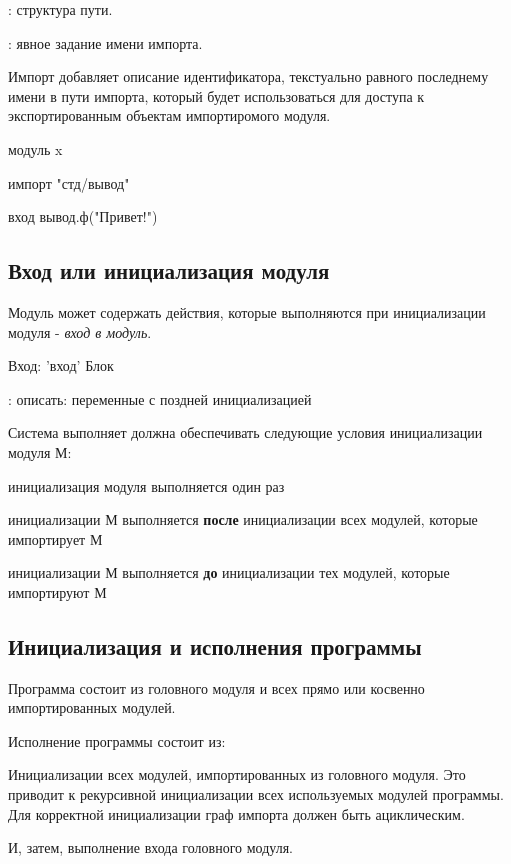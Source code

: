 \TBD: структура пути.

\TBD: явное задание имени импорта.

\bigskip
Импорт добавляет описание идентификатора, текстуально равного последнему имени в пути импорта, который будет использоваться для доступа к экспортированным объектам импортиромого модуля. 

\begin{Trivil}
модуль x

импорт "стд/вывод"

вход {
    вывод.ф("Привет!")
}
\end{Trivil}



\hypertarget{entry}{%
\subsection{Вход или инициализация модуля}\label{mods:entry}}

Модуль может содержать действия, которые выполняются при инициализации модуля - \emph{вход в модуль}. 

\begin{Trivil}
Вход: 'вход' Блок
\end{Trivil}

\TBD: описать: переменные с поздней инициализацией
\bigskip

Система выполняет должна обеспечивать следующие условия инициализации модуля М:
\begin{d_itemize}
\item
    инициализация модуля выполняется один раз
\item
    инициализации М выполняется \textbf{после} инициализации всех модулей, которые импортирует М
\item
    инициализации М выполняется \textbf{до} инициализации тех модулей, которые импортируют М
\end{d_itemize}

\hypertarget{entry}{%
\subsection{Инициализация и исполнения программы}\label{mods:entry}}

Программа состоит из головного модуля и всех прямо или косвенно импортированных модулей.

Исполнение программы состоит из:
\begin{d_itemize}
\item
    Инициализации всех модулей, импортированных из головного модуля. Это приводит к рекурсивной инициализации всех используемых модулей
    программы. Для корректной инициализации граф импорта должен быть ациклическим.
\item
    И, затем, выполнение входа головного модуля.
\end{d_itemize}

